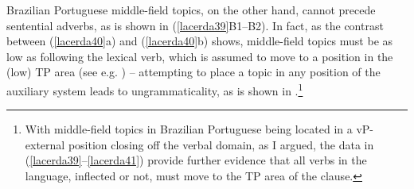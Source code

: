 \documentclass[output=paper]{langscibook}
\begin{document}
\begin{exe}
\ex \label{lacerda38}
\begin{xlist}

\citep[162]{Frey2004}
\end{xlist}
\end{exe}

Brazilian Portuguese middle-field topics, on the other hand, cannot precede sentential adverbs, as is shown in (\ref{lacerda39}B1--B2). In fact, as the contrast between (\ref{lacerda40}a) and (\ref{lacerda40}b) shows, middle-field topics must be as low as following the lexical verb, which is assumed to move to a  position in the (low) TP area (see e.g. \citealt{TescariNeto2013}) -- attempting to place a topic in any position of the auxiliary system leads to ungrammaticality, as is shown in .\footnote{With middle-field topics in Brazilian Portuguese being located in a vP-external position closing off the verbal domain, as I argued, the data in (\ref{lacerda39}--\ref{lacerda41}) provide further evidence that all verbs in the language, inflected or not, must move to the TP area of the clause.}
\end{document}
